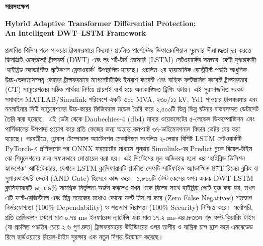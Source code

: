 \documentclass[12pt,a4paper,oneside]{report}
\newcommand{\bn}[1]{{\bengalifont #1}}
\begin{document}
\clearpage\thispagestyle{fancy}
\vspace{-2pt}
\begin{center}{\large\bfseries\bn{সারসংক্ষেপ}}\par\vspace{8pt}
{\bfseries Hybrid Adaptive Transformer Differential Protection:\\ An Intelligent DWT--LSTM Framework\par}\end{center}
\vspace{6pt}
{\bengalifont
প্রস্তাবিত থিসিস পত্রে পাওয়ার ট্রান্সফরমারে বিদ্যমান প্রচলিত পার্সেন্টেজ ডিফারেনশিয়াল সুরক্ষার সীমাবদ্ধতা দূর করতে ডিসক্রিট ওয়েভলেট ট্রান্সফর্ম (DWT) এবং লং শর্ট-টার্ম মেমোরি (LSTM) নেটওয়ার্কের সমন্বয়ে একটি যুগান্তকারী ‘হাইব্রিড অ্যাডাপ্টিভ প্রটেকশন ফ্রেমওয়ার্ক’ উপস্থাপিত হয়েছে। প্রচলিত ২য় হারমোনিক রেস্ট্রেইন্ট পদ্ধতি আধুনিক উচ্চ-ভেদ্যতাসম্পন্ন কোরের ট্রান্সফরমারে ম্যাগনেটাইজিং ইনরাশ কারেন্ট এবং বাহ্যিক ফল্টজনিত কারেন্ট ট্রান্সফরমার (CT) স্যাচুরেশনের সঠিক পার্থক্য নির্ণয়ে প্রায়শই ব্যর্থ হয়ে অনাকাঙ্ক্ষিত ট্রিপিং ঘটায়। এই সুরক্ষাজনিত সংকট সমাধানে MATLAB/Simulink পরিবেশে একটি ৩০০ MVA, ২৩০/১১ kV, Yd1 পাওয়ার ট্রান্সফরমার এবং ননলাইনার সিটি স্যাচুরেশনের উচ্চ-স্তরের ফিজিক্যাল মডেল তৈরি করে ২,৫০০টি ভিন্ন ভিন্ন ঘটনার বাস্তবসম্মত ডেটাসেট তৈরি করা হয়েছে। এই ডেটা থেকে Daubechies-4 (db4) মাদার ওয়েভলেটের ৫-লেভেল ডিকম্পোজিশন এবং পার্সিভালের উপপাদ্য প্রয়োগ করে প্রতি ফেজের জন্য অত্যন্ত কমপ্যাক্ট ৩৭-ডাইমেনশনাল ফিচার ভেক্টর বের করা হয়েছে। পরবর্তীতে, গ্লোবাল টেম্পোরাল অ্যাটেনশন মেকানিজম সংবলিত ২-লেয়ার বিশিষ্ট LSTM নেটওয়ার্কটি PyTorch-এ প্রশিক্ষণের পর ONNX ফরম্যাটের মাধ্যমে পুনরায় Simulink-এর Predict ব্লকে রিয়েল-টাইম কো-সিমুলেশনের জন্য সফলভাবে মোতায়েন করা হয়। এই সিস্টেমের মূল অভিনবত্ব হলো এর ‘হাইব্রিড ডিসিশন হ্যান্ডশেক’ আর্কিটেকচার, যেখানে LSTM ক্লাসিফায়ারটি প্রচলিত সেফটি-সার্টিফাইড অ্যাডাপ্টিভ 87T রিলের ব্লকিং বা সুপারভাইজরি ভেটো (AND Gate) হিসেবে কাজ করে। ১,৮০০টি টেস্ট কেসের ওপর একক DWT-LSTM ক্লাসিফায়ারটি ৯৮.৮৯\% সামগ্রিক নির্ভুলতা অর্জন করলেও যখন একে রিলের সাথে হাইব্রিড গেটে যুক্ত করা হয়, তখন এটি ফল্ট-রেজিস্ট্যান্স এবং তীব্র নয়েজের মধ্যেও কোনো ফল্ট মিস না করে (Zero False Negatives) শতভাগ নির্ভরযোগ্যতা (100\% Dependability) ও শতভাগ নিরাপত্তা (100\% Security) নিশ্চিত করে। সর্বোপরি, প্রতি প্রেডিকশন স্টেপে মাত্র ০.৭৪ ms ইনফারেন্স ল্যাটেন্সি এবং মাত্র ১৭.২ ms-এর দ্রুততম গড় ফল্ট-ক্লিয়ারিং টাইম (যা প্রচলিত পদ্ধতির চেয়ে ২.৬ গুণ দ্রুত) ট্রান্সফরমারের উইন্ডিংয়ের ওপর তাপীয় ও যান্ত্রিক চাপ হ্রাস করে এমবেডেড রিলে হার্ডওয়্যারে রিয়েল-টাইম সুরক্ষার এক নতুন দিগন্ত উন্মোচন করেছে।
\par}
\end{document}
